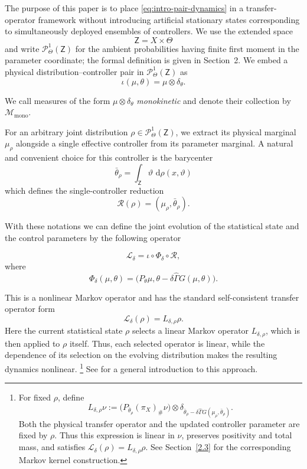 \documentclass[11pt]{article}
\theoremstyle{definition}
\theoremstyle{remark}
\newcommand{\ProbThetaOne}{\mathcal{P}_{\Theta}^{1}}
\newcommand{\STO}{\mathcal{L}}
\newcommand{\Lin}{L}
\newcommand{\dd}{\,\mathrm{d}}
\newcommand{\ThetaSet}{\Theta}
\newcommand{\Gammahat}{\widehat{\Gamma}}
\newcommand{\Z}{\mathsf{Z}}
\newcommand{\Mmono}{\mathscr{M}_{\mathrm{mono}}}
\begin{document}
The purpose of this paper is to place \eqref{eq:intro-pair-dynamics} in a
transfer-operator framework without introducing artificial stationary states
corresponding to simultaneously deployed ensembles of controllers.  We use the
extended space
\[
  \Z=X\times\ThetaSet
\]
and write \(\ProbThetaOne(\Z)\) for the ambient probabilities having finite
first moment in the parameter coordinate; the formal definition is given in
Section~2.  We embed a physical distribution--controller pair  in \(\ProbThetaOne(\Z)\) as
\[
  \iota(\mu,\theta)=\mu\otimes\delta_\theta.
\]


We call measures of the form $\mu\otimes\delta_\theta$
{\em monokinetic} and denote their collection by $\Mmono$.


For an arbitrary joint distribution \(\rho\in\ProbThetaOne(\Z)\), we extract its physical marginal \(\mu_\rho\) alongside a single effective controller from its parameter marginal. A natural and convenient choice for this controller is the barycenter
\[
  \bar\theta_\rho
  =\int_{\Z}\vartheta\,\dd\rho(x,\vartheta)
\]
which defines the single-controller reduction
\[
  \mathcal R(\rho)=(\mu_\rho,\bar\theta_\rho).
\]


With these notations we can define the joint evolution of the statistical state and the control parameters by the following operator
  
\begin{equation}
  \boxed{
  \STO_\delta
  =\iota\circ\Phi_\delta\circ\mathcal R,}
  \label{eq:intro-factorization}
\end{equation}
where
\[
  \Phi_\delta(\mu,\theta)
  =\bigl(P_\theta\mu,
         \theta-\delta\Gammahat G(\mu,\theta)\bigr).
\]


  This is a nonlinear Markov operator and has the standard
self-consistent transfer operator form
\[
  \STO_\delta(\rho)=\Lin_{\delta,\rho}\rho.
\]
Here the current statistical state $\rho$ selects a linear
Markov operator $\Lin_{\delta,\rho}$, which is then applied
to $\rho$ itself.
Thus, each selected operator is linear, while the dependence
of its selection on the evolving distribution makes the
resulting dynamics nonlinear.
\footnote{For fixed $\rho$, define
\[
  \Lin_{\delta,\rho}\nu
  :=
  \bigl(P_{\bar\theta_\rho}(\pi_X)_\#\nu\bigr)
  \otimes
  \delta_{\bar\theta_\rho
  -\delta\widehat\Gamma G(\mu_\rho,\bar\theta_\rho)}.
\]
Both the physical transfer operator and the updated controller
parameter are fixed by $\rho$. Thus this expression is linear
in $\nu$, preserves positivity and total mass, and satisfies
$\STO_\delta(\rho)=\Lin_{\delta,\rho}\rho$.
See Section~\ref{2.3} for the corresponding Markov kernel construction.}
See \cite{GalatoloCMP} for a general introduction to this
approach.
  
\end{document}
